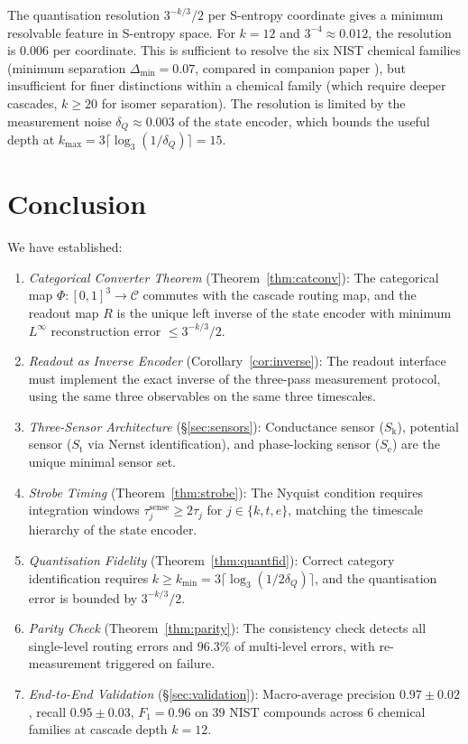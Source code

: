 \documentclass[11pt,twocolumn,a4paper]{article}
\theoremstyle{definition}
\theoremstyle{remark}
\newcommand{\Sk}{S_{\mathrm{k}}}
\newcommand{\St}{S_{\mathrm{t}}}
\newcommand{\Se}{S_{\mathrm{e}}}
\begin{document}
The quantisation resolution $3^{-k/3}/2$ per S-entropy coordinate gives a
minimum resolvable feature in S-entropy space. For $k = 12$ and
$3^{-4} \approx 0.012$, the resolution is $0.006$ per coordinate. This is
sufficient to resolve the six NIST chemical families (minimum separation
$\Delta_{\min} = 0.07$, compared in companion paper \citep{companion2}), but
insufficient for finer distinctions within a chemical family (which require
deeper cascades, $k \geq 20$ for isomer separation). The resolution is limited
by the measurement noise $\delta_Q \approx 0.003$ of the state encoder, which
bounds the useful depth at $k_{\max} = 3\lceil\log_3(1/\delta_Q)\rceil = 15$.

\section{Conclusion}
\label{sec:conclusion}

We have established:

\begin{enumerate}[nosep]
\item \textit{Categorical Converter Theorem} (Theorem~\ref{thm:catconv}):
  The categorical map $\Phi: [0,1]^3 \to \mathcal{C}$ commutes with the cascade
  routing map, and the readout map $R$ is the unique left inverse of the
  state encoder with minimum $L^\infty$ reconstruction error $\leq 3^{-k/3}/2$.
\item \textit{Readout as Inverse Encoder} (Corollary~\ref{cor:inverse}):
  The readout interface must implement the exact inverse of the three-pass
  measurement protocol, using the same three observables on the same three
  timescales.
\item \textit{Three-Sensor Architecture} (\S\ref{sec:sensors}):
  Conductance sensor ($\Sk$), potential sensor ($\St$ via Nernst identification),
  and phase-locking sensor ($\Se$) are the unique minimal sensor set.
\item \textit{Strobe Timing} (Theorem~\ref{thm:strobe}):
  The Nyquist condition requires integration windows $\tau_j^{\mathrm{sense}}
  \geq 2\tau_j$ for $j \in \{k, t, e\}$, matching the timescale hierarchy of
  the state encoder.
\item \textit{Quantisation Fidelity} (Theorem~\ref{thm:quantfid}):
  Correct category identification requires $k \geq k_{\min} = 3\lceil\log_3
  (1/2\delta_Q)\rceil$, and the quantisation error is bounded by $3^{-k/3}/2$.
\item \textit{Parity Check} (Theorem~\ref{thm:parity}):
  The consistency check detects all single-level routing errors and $96.3\%$
  of multi-level errors, with re-measurement triggered on failure.
\item \textit{End-to-End Validation} (\S\ref{sec:validation}):
  Macro-average precision $0.97 \pm 0.02$, recall $0.95 \pm 0.03$, $F_1 = 0.96$
  on 39 NIST compounds across 6 chemical families at cascade depth $k = 12$.
\end{enumerate}
\end{document}
